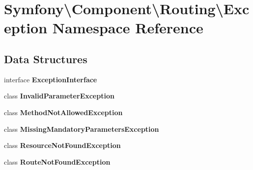 \section{Symfony\textbackslash{}Component\textbackslash{}Routing\textbackslash{}Exception Namespace Reference}
\label{namespace_symfony_1_1_component_1_1_routing_1_1_exception}
\subsection*{Data Structures}
\begin{DoxyCompactItemize}
\item 
interface {\bf Exception\+Interface}
\item 
class {\bf Invalid\+Parameter\+Exception}
\item 
class {\bf Method\+Not\+Allowed\+Exception}
\item 
class {\bf Missing\+Mandatory\+Parameters\+Exception}
\item 
class {\bf Resource\+Not\+Found\+Exception}
\item 
class {\bf Route\+Not\+Found\+Exception}
\end{DoxyCompactItemize}
